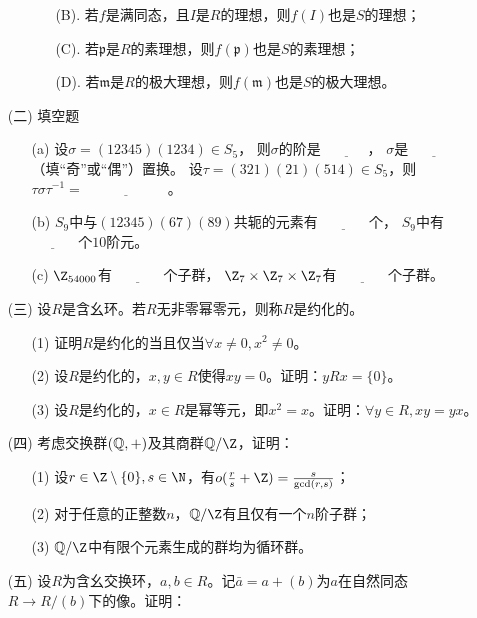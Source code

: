 \begin{itemize}
\begin{itemize}
\begin{itemize}
            \item[(B).]若$f$是满同态，且$I$是$R$的理想，则$f(I)$也是$S$的理想；
            \item[(C).]若$\mathfrak{p}$是$R$的素理想，则$f(\mathfrak{p})$也是$S$的素理想；
            \item[(D).]若$\mathfrak{m}$是$R$的极大理想，则$f(\mathfrak{m})$也是$S$的极大理想。
        \end{itemize}
    \end{itemize}
    \item[(二)]填空题
    \begin{itemize}
        \item[(a)]设$\sigma = (12345)(1234) \in S_5$，
        则$\sigma$的阶是 $\underline{\qquad\quad}$，
        $\sigma$是 $\underline{\qquad\quad}$ （填“奇”或“偶”）置换。
        设$\tau = (321)(21)(514) \in S_5$，则$\tau \sigma \tau^{-1}=\underline{\qquad\qquad\qquad}$。
        \item[(b)]$S_9$中与$(12345)(67)(89)$共轭的元素有 $\underline{\qquad\quad}$ 个，
        $S_9$中有 $\underline{\qquad\quad}$ 个$10$阶元。
        \item[(c)]$\Z_{54000}$有 $\underline{\qquad\quad}$ 个子群，
        $\Z_7 \times \Z_7 \times \Z_7$有 $\underline{\qquad\quad}$ 个子群。
    \end{itemize}
    \item[(三)]设$R$是含幺环。若$R$无非零幂零元，则称$R$是约化的。
    \begin{itemize}
        \item[(1)]证明$R$是约化的当且仅当$\forall x \neq 0,x^2 \neq 0$。
        \item[(2)]设$R$是约化的，$x,y \in R$使得$xy = 0$。证明：$yRx = \{0\}$。
        \item[(3)]设$R$是约化的，$x \in R$是幂等元，即$x^2 = x$。证明：$\forall y \in R,xy = yx$。
    \end{itemize}
    \item[(四)]考虑交换群$(\mathbb{Q},+)$及其商群$\Q/\Z$，证明：
    \begin{itemize}
        \item[(1)]设$r \in \Z\setminus\{0\},s \in \N$，有$o(\frac{r}{s} + \Z) = \frac{s}{\operatorname{gcd}(r,s)}$；
        \item[(2)]对于任意的正整数$n$，$\Q/\Z$有且仅有一个$n$阶子群；
        \item[(3)]$\Q/\Z$中有限个元素生成的群均为循环群。
    \end{itemize}
    \item[(五)]设$R$为含幺交换环，$a,b \in R$。记$\bar{a} = a + (b)$为$a$在自然同态$R \to R/(b)$下的像。证明：

\end{itemize}
